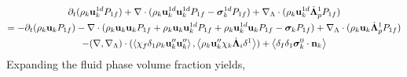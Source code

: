 \begin{multline}
    \partial_t (\rho_k \textbf{u}_k^{1d}  P_{1f})
    + \mathbf{\nabla}\cdot (
         \rho_k \textbf{u}_k^{1d} \textbf{u}_k^{1d}  P_{1f}
        - \bm\sigma_k^{1d} P_{1f}
        )
    +  \mathbf{\nabla}_\Lambda \cdot ( \rho_k \textbf{u}_k^{1d} \dot{\bm\Lambda}_p^1  P_{1f} )\\
    = 
    - \partial_t (\rho_k \textbf{u}_k  P_{1f})
    - \mathbf{\nabla}\cdot (
        \rho_k \textbf{u}_k \textbf{u}_k  P_{1f}
        + \rho_k \textbf{u}_k \textbf{u}_k^{1d}  P_{1f}
        + \rho_k \textbf{u}_k^{1d} \textbf{u}_k  P_{1f}
        - \bm\sigma_k P_{1f}
        )
    +  \mathbf{\nabla}_\Lambda \cdot ( \rho_k \textbf{u}_k \dot{\bm\Lambda}_p^1  P_{1f} )\\
    - (\mathbf{\nabla},\mathbf{\nabla}_\Lambda)\cdot(\left<\chi_f \delta_1 \rho_k \textbf{u}''_k\textbf{u}''_k\right>,\left<\rho_k \textbf{u}_k'' \chi_k \dot{\bm\Lambda}_i \delta^1\right>)
    + \left<\delta_I\delta_1
         \bm\sigma_k^0
    \cdot \textbf{n}_k\right>\\ 
\end{multline}
Expanding the fluid phase volume fraction yields, 


